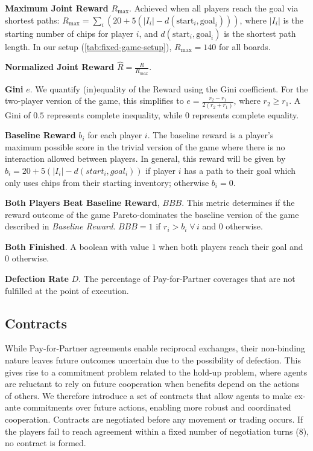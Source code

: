 \documentclass{article} %
\newcommand{\PforP}{Pay-for-Partner\xspace}
\begin{document}
\textbf{Maximum Joint Reward} $R_{\max}$. Achieved when all players reach the goal via shortest paths: $R_{\max} = \sum_{i} \left(20 + 5\left(\lvert I_i \rvert - d(\text{start}_i, \text{goal}_i)\right)\right)$,
where \(\lvert I_i \rvert\) is the starting number of chips for player $i$, and \(d(\text{start}_i, \text{goal}_i)\) is the shortest path length. In our setup (\cref{tab:fixed-game-setup}), \(R_{\max} = 140\) for all boards.

\textbf{Normalized Joint Reward} $\hat{R} = \frac{R}{R_{max}}$.

\textbf{Gini} $e$. We quantify (in)equality of the Reward using the Gini coefficient. For the two-player version of the game, this simplifies to $e= \frac{r_{2} - r_{1}}{2(r_{2}+r_{1})}$, where $r_{2} \geq r_{1}$. A Gini of $0.5$ represents complete inequality, while $0$ represents complete equality.

\textbf{Baseline Reward} $b_{i}$ for each player $i$. The baseline reward is a player's maximum possible score in the trivial version of the game where there is no interaction allowed between players. In general, this reward will be given by $b_{i} = 20 + 5(\lvert I_i \rvert - d(start_i, goal_i))$ if player $i$ has a path to their goal which only uses chips from their starting inventory;  otherwise $b_{i} = 0$.

\textbf{Both Players Beat Baseline Reward}, $BBB$. This metric determines if the reward outcome of the game Pareto-dominates the baseline version of the game described in \textit{Baseline Reward}. $BBB = 1$ if $r_i > b_i \;\forall\, i$ and 
0 otherwise. 

\textbf{Both Finished}. A boolean with value $1$ when both players reach their goal and $0$ otherwise. 

\textbf{Defection Rate} $D$. The percentage of \PforP coverages that are not fulfilled at the point of execution.


\subsection{Contracts}
\label{subsec:contracts}

While \PforP agreements enable reciprocal exchanges, their non-binding nature leaves future outcomes uncertain due to the possibility of defection. This gives rise to a commitment problem related to the hold-up problem, where agents are reluctant to rely on future cooperation when benefits depend on the actions of others. We therefore introduce a set of contracts that allow agents to make ex-ante commitments over future actions, enabling more robust and coordinated cooperation. Contracts are negotiated before any movement or trading occurs. If the players fail to reach agreement within a fixed number of negotiation turns (8), no contract is formed.
\end{document}
